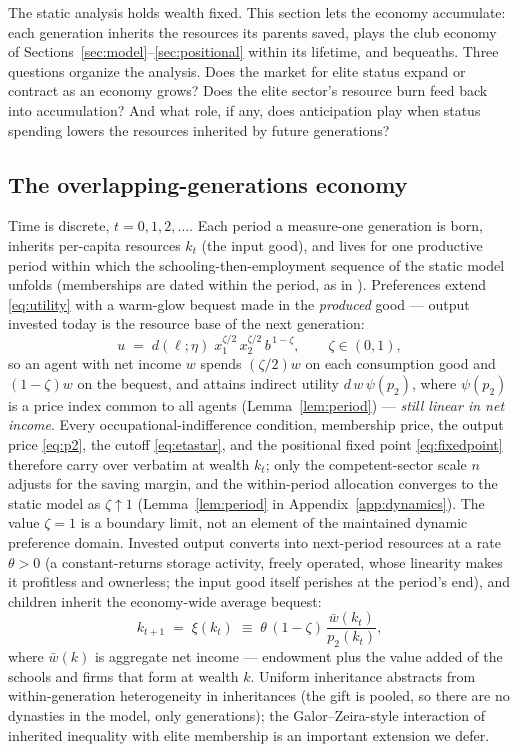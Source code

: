 \documentclass[12pt,letterpaper]{article}
\theoremstyle{definition}
\begin{document}
The static analysis holds wealth fixed.
This section lets the economy accumulate: each generation inherits the resources its parents saved, plays the club economy of Sections~\ref{sec:model}--\ref{sec:positional} within its lifetime, and bequeaths.
Three questions organize the analysis.
Does the market for elite status expand or contract as an economy grows?
Does the elite sector's resource burn feed back into accumulation?
And what role, if any, does anticipation play when status spending lowers the resources inherited by future generations?

\subsection{The overlapping-generations economy}

Time is discrete, $t=0,1,2,\dots$.
Each period a measure-one generation is born, inherits per-capita resources $k_t$ (the input good), and lives for one productive period within which the schooling-then-employment sequence of the static model unfolds (memberships are dated within the period, as in \citealt{ellickson2006organization}).
Preferences extend \eqref{eq:utility} with a warm-glow bequest made in the \emph{produced} good --- output invested today is the resource base of the next generation:
\begin{equation}\label{eq:olg-utility}
  u \;=\; d(\ell;\eta)\; x_1^{\zeta/2}\, x_2^{\zeta/2}\, b^{\,1-\zeta},
  \qquad \zeta\in(0,1),
\end{equation}
so an agent with net income $w$ spends $(\zeta/2)w$ on each consumption good and $(1-\zeta)w$ on the bequest, and attains indirect utility $d\,w\,\psi(p_2)$, where $\psi(p_2)$ is a price index common to all agents (Lemma~\ref{lem:period}) --- \emph{still linear in net income}.
Every occupational-indifference condition, membership price, the output price \eqref{eq:p2}, the cutoff \eqref{eq:etastar}, and the positional fixed point \eqref{eq:fixedpoint} therefore carry over verbatim at wealth $k_t$; only the competent-sector scale $n$ adjusts for the saving margin, and the within-period allocation converges to the static model as $\zeta\uparrow1$ (Lemma~\ref{lem:period} in Appendix~\ref{app:dynamics}).
The value $\zeta=1$ is a boundary limit, not an element of the maintained dynamic preference domain.
Invested output converts into next-period resources at a rate $\theta>0$ (a constant-returns storage activity, freely operated, whose linearity makes it profitless and ownerless; the input good itself perishes at the period's end), and children inherit the economy-wide average bequest:
\begin{equation}\label{eq:transition}
  k_{t+1} \;=\; \xi(k_t) \;\equiv\; \theta\,(1-\zeta)\,\frac{\bar{w}(k_t)}{p_2(k_t)},
\end{equation}
where $\bar{w}(k)$ is aggregate net income --- endowment plus the value added of the schools and firms that form at wealth $k$.
Uniform inheritance abstracts from within-generation heterogeneity in inheritances (the gift is pooled, so there are no dynasties in the model, only generations); the Galor--Zeira-style interaction of inherited inequality with elite membership is an important extension we defer.
\end{document}
